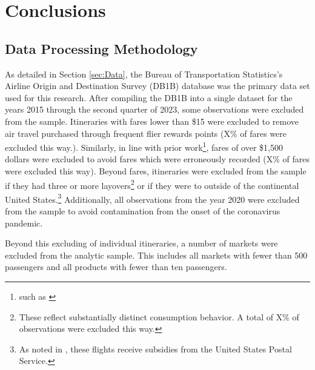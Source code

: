 \documentclass{article}
\begin{document}

	
	\section{Conclusions}
	\label{sec:Conclusion}
	
	\pagebreak 
	 
	
	\FloatBarrier
	
\pagebreak	\begin{appendices}
	
	\section{Data Processing Methodology}
	\label{sec:DataProcessing}
	As detailed in Section \ref{sec:Data},	the Bureau of Transportation Statistics's Airline Origin and Destination Survey (DB1B) database was the primary data set used for this research. After compiling the DB1B into a single dataset for the years 2015 through the second quarter of 2023, some observations were excluded from the sample. Itineraries with fares lower than \$15 were excluded to remove air travel purchased through frequent flier rewards points ({X}\% of fares were excluded this way.). Similarly, in line with prior work\footnote{such as \citet{berry_tracing_2010}}, fares of over \$1,500 dollars were excluded to avoid fares which were erroneously recorded (X\% of fares were excluded this way). Beyond fares, itineraries were excluded from the sample if they had three or more layovers\footnote{These reflect substantially distinct consumption behavior. A total of X\% of observations were excluded this way.} or if they were to outside of the continental United States.\footnote{As noted in \citet{ciliberto_market_2021}, these flights receive subsidies from the United States Postal Service.} Additionally, all observations from the year 2020 were excluded from the sample to avoid contamination from the onset of the coronavirus pandemic.
	
	Beyond this excluding of individual itineraries, a number of markets were excluded from the analytic sample. This includes all markets with fewer than 500 passengers and all products with fewer than ten passengers. 
	

\end{appendices}
\end{document}

